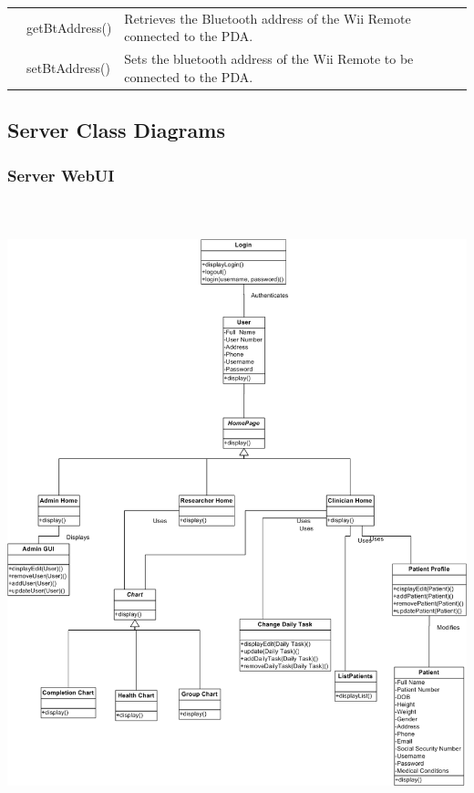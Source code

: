 \documentclass{article}
\begin{document}
\begin{longtable}[t]{|p{1.5in}|p{2in}|p{2.5in}|}
      \cline{2-3}
      
      & getBtAddress() & Retrieves the Bluetooth address of the Wii Remote connected to the PDA.  \\
      
      \cline{2-3}
      
      & setBtAddress() & Sets the bluetooth address of the Wii Remote to be connected to the PDA.  \\
      
      \cline{2-3}


\hline
\end{longtable}

\subsection{Server Class Diagrams}

\subsubsection{Server WebUI}

\begin{center}
\includegraphics[width=6in,height=7.12in]{Server_Web_UI.png}
\end{center}
\end{document}
